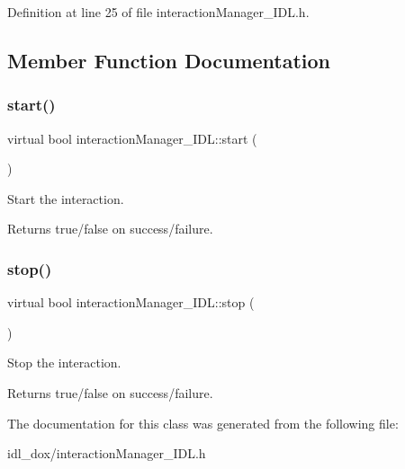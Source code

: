 Definition at line 25 of file interaction\+Manager\+\_\+\+I\+D\+L.\+h.



\subsection{Member Function Documentation}
\mbox{\label{classinteractionManager__IDL_ad6c8ab9126614fd7e07968e4c430be25}} 
\subsubsection{\texorpdfstring{start()}{start()}}
{\footnotesize\ttfamily virtual bool interaction\+Manager\+\_\+\+I\+D\+L\+::start (\begin{DoxyParamCaption}{ }\end{DoxyParamCaption})\hspace{0.3cm}{\ttfamily [virtual]}}



Start the interaction. 

\begin{DoxyReturn}{Returns}
true/false on success/failure. 
\end{DoxyReturn}
\mbox{\label{classinteractionManager__IDL_a0a3e324a4ab82896e627e83803137595}} 
\subsubsection{\texorpdfstring{stop()}{stop()}}
{\footnotesize\ttfamily virtual bool interaction\+Manager\+\_\+\+I\+D\+L\+::stop (\begin{DoxyParamCaption}{ }\end{DoxyParamCaption})\hspace{0.3cm}{\ttfamily [virtual]}}



Stop the interaction. 

\begin{DoxyReturn}{Returns}
true/false on success/failure. 
\end{DoxyReturn}


The documentation for this class was generated from the following file\+:\begin{DoxyCompactItemize}
\item 
idl\+\_\+dox/interaction\+Manager\+\_\+\+I\+D\+L.\+h\end{DoxyCompactItemize}
